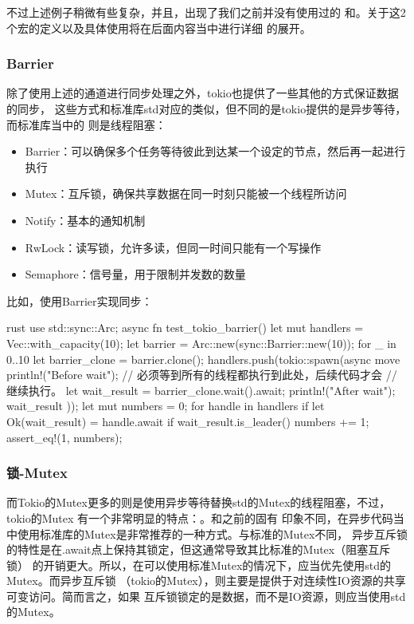 不过上述例子稍微有些复杂，并且，出现了我们之前并没有使用过的
和。关于这2个宏的定义以及具体使用将在后面内容当中进行详细
的展开。

\subsubsection{Barrier}
除了使用上述的通道进行同步处理之外，tokio也提供了一些其他的方式保证数据的同步，
这些方式和标准库std对应的类似，但不同的是tokio提供的是异步等待，而标准库当中的
则是线程阻塞：
\begin{itemize}
  \item Barrier：可以确保多个任务等待彼此到达某一个设定的节点，然后再一起进行执行
  \item Mutex：互斥锁，确保共享数据在同一时刻只能被一个线程所访问
  \item Notify：基本的通知机制
  \item RwLock：读写锁，允许多读，但同一时间只能有一个写操作
  \item Semaphore：信号量，用于限制并发数的数量
\end{itemize}

比如，使用Barrier实现同步：
\begin{code-block}{rust}
use std::sync::Arc;
async fn test_tokio_barrier() {
    let mut handlers = Vec::with_capacity(10);
    let barrier = Arc::new(sync::Barrier::new(10));
    for _ in 0..10 {
        let barrier_clone = barrier.clone();
        handlers.push(tokio::spawn(async move {
            println!("Before wait");
            // 必须等到所有的线程都执行到此处，后续代码才会
            // 继续执行。
            let wait_result = barrier_clone.wait().await;
            println!("After wait");
            wait_result
        }));
    }
    let mut numbers = 0;
    for handle in handlers {
        if let Ok(wait_result) = handle.await {
            if wait_result.is_leader() {
                numbers += 1;
            }
        }
    }
    assert_eq!(1, numbers);
}
\end{code-block}

\subsubsection{锁-Mutex}
而Tokio的Mutex更多的则是使用异步等待替换std的Mutex的线程阻塞，不过，tokio的Mutex
有一个非常明显的特点：。和之前的固有
印象不同，在异步代码当中使用标准库的Mutex是非常推荐的一种方式。与标准的Mutex不同，
异步互斥锁的特性是在.await点上保持其锁定，但这通常导致其比标准的Mutex（阻塞互斥锁）
的开销更大。所以，在可以使用标准Mutex的情况下，应当优先使用std的Mutex。而异步互斥锁
（tokio的Mutex），则主要是提供于对连续性IO资源的共享可变访问。简而言之，如果
互斥锁锁定的是数据，而不是IO资源，则应当使用std的Mutex。

